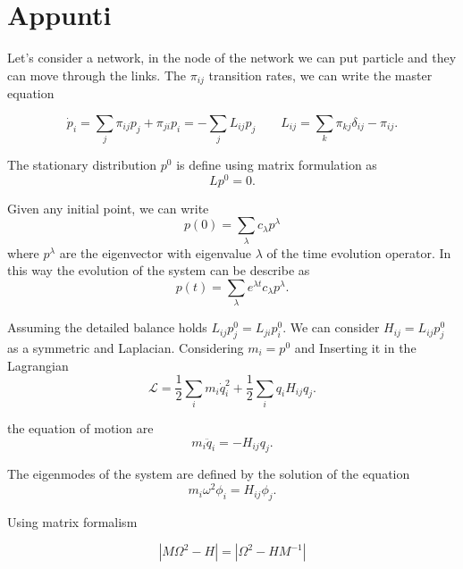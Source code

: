 \chapter{Appunti}

Let's consider a network, in the node of the network we can put particle and they can move through the links. The $\pi_{ij}$ transition rates, we can write the master equation

\begin{equation}\label{master_equation}
    \dot p_i = \sum_j \pi_{ij}p_j + \pi_{ji} p_i = - \sum_j L_{ij} p_j
    \qquad L_{ij} = \sum_k \pi_{kj}\delta_{ij} - \pi_{ij} .
\end{equation}

The stationary distribution $p^0$ is define using matrix formulation as 
\begin{equation}
    L p^0 = 0 .
\end{equation}

Given any initial point, we can write 
\begin{equation}
    p(0) = \sum_\lambda c_\lambda p^\lambda
\end{equation}
where $p^\lambda$ are the eigenvector with eigenvalue $\lambda$ of the time evolution operator. In this way the evolution of the system can be describe as
\begin{equation}
    p(t) = \sum_\lambda e^{\lambda t} c_\lambda p^\lambda .
\end{equation}

Assuming the detailed balance holds $L_{ij} p^0_j= L_{ji}p^0_i$. We can consider $H_{ij}= L_{ij}p^0_j$ as a symmetric and Laplacian. 
Considering $m_i = p^0$ and Inserting it in the Lagrangian
\begin{equation}
    \mathcal{L} = \frac{1}{2} \sum_i m_i \dot q_i^2 +\frac{1}{2} \sum_i q_i H_{ij} q_j.
\end{equation}

the equation of motion are
\begin{equation} \label{eq_of_motion}
    m_i \ddot q_i = -H_{ij} q_j.
\end{equation}

The eigenmodes of the system are defined by the solution of the equation 
\begin{equation}
    m_i \omega^2 \phi_i = H_{ij} \phi_j.
\end{equation}

Using matrix formalism 

\begin{equation}
    |M\Omega^2 - H| = |\Omega^2 - HM^{-1}|
\end{equation}

